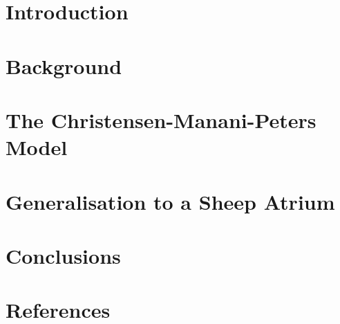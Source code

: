 \documentclass[a4paper, 12pt]{report}
\newcommand{\detailtexcount}[1]{%
  \immediate\write18{texcount -merge -sum #1.tex > #1.wcdetail }%
}
\numberwithin{equation}{chapter}
\numberwithin{figure}{chapter}
\def\cmp{{Christensen-Manani-Peters}\xspace}
\def\projectfilename{{ProjectReport-01055136-AF}}
\begin{document}
	\begin{titlepage}
        
	\end{titlepage}


	\begin{abstract}
        \normalsize 
	\end{abstract}

	\tableofcontents

	\chapter{Introduction} \label{ch:introduction}
	
	
	\chapter{Background} \label{ch:biologicalbackground}
    
		
	\chapter{The \cmp Model} \label{ch:cmpmodel}
	
	
	\chapter{Generalisation to a Sheep Atrium} \label{ch:generalisation}
	

	\chapter{Conclusions} \label{ch:conclusion}
	

	\chapter{References} \label{ch:regerences}
	
	\renewcommand{\chapter}[2]{}
	
	
	
\end{document}
